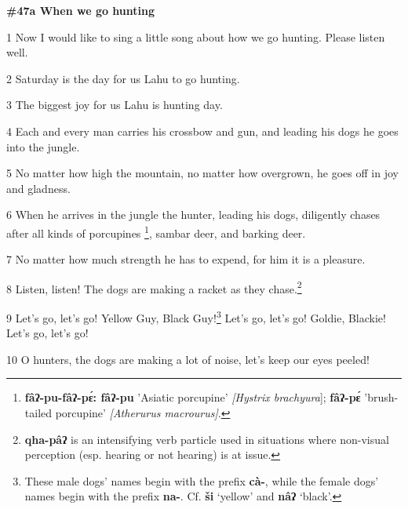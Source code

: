 
\textbf{\#47a When we go hunting}

1 Now I would like to sing a little song about how we go hunting. Please listen
well.

2 Saturday is the day for us Lahu to go hunting.

3 The biggest joy for us Lahu is hunting day.

4 Each and every man carries his crossbow and gun, and leading his dogs he goes
into the jungle.

5 No matter how high the mountain, no matter how overgrown, he goes off in joy
and gladness.

6 When he arrives in the jungle the hunter, leading his dogs, diligently chases
after all kinds of porcupines \footnote{\textbf{fâʔ-pu-fâʔ-pɛ́: fâʔ-pu }'Asiatic porcupine'\textit{ [Hystrix brachyura}]; \textbf{fâʔ-pɛ́ }'brush-tailed porcupine' \textit{[Atherurus macrourus]}.}, sambar deer, and barking deer.

7 No matter how much strength he has to expend, for him it is a pleasure.

8 Listen, listen! The dogs are making a racket as they chase.\footnote{\textbf{qha-pâʔ} is an intensifying verb particle used in situations where non-visual perception (esp. hearing or not hearing) is at issue.}

9 Let's go, let's go! Yellow Guy, Black Guy!\footnote{These male dogs' names begin with the prefix \textbf{cà-}, while the female dogs' names begin with the prefix \textbf{na-}. Cf. \textbf{ši} `yellow' and \textbf{nâʔ} `black'.} Let's go, let's go! Goldie, Blackie!
Let's go, let's go!

10 O hunters, the dogs are making a lot of noise, let's keep our eyes peeled!

